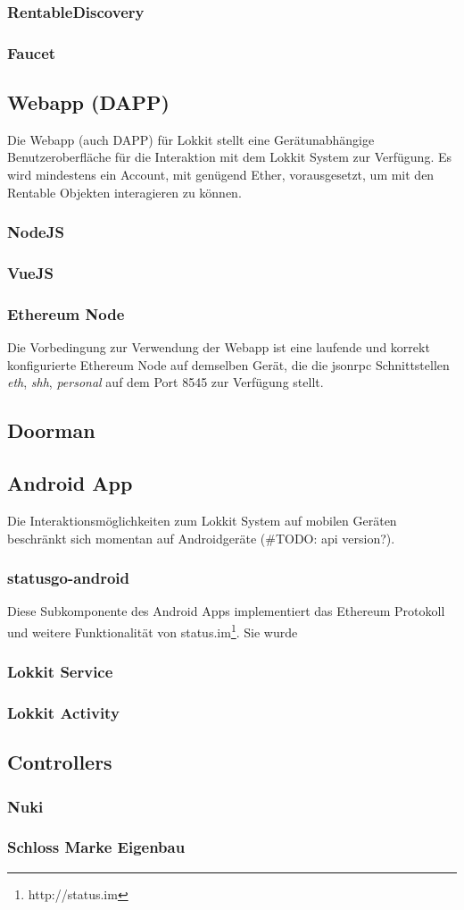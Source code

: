 \subsubsection{RentableDiscovery}
\subsubsection{Faucet}

\subsection{Webapp (DAPP)}
Die Webapp (auch DAPP) für Lokkit stellt eine Gerätunabhängige Benutzeroberfläche für die Interaktion mit dem Lokkit System zur Verfügung. Es wird mindestens ein Account, mit genügend Ether, vorausgesetzt, um mit den Rentable Objekten interagieren zu können.
\subsubsection{NodeJS}
\subsubsection{VueJS}
\subsubsection{Ethereum Node}
Die Vorbedingung zur Verwendung der Webapp ist eine laufende und korrekt konfigurierte Ethereum Node auf demselben Gerät, die die jsonrpc Schnittstellen \emph{eth}, \emph{shh}, \emph{personal} auf dem Port 8545 zur Verfügung stellt.


\subsection{Doorman}

\subsection{Android App}
Die Interaktionsmöglichkeiten zum Lokkit System auf mobilen Geräten beschränkt sich momentan auf Androidgeräte (\#TODO: api version?).
\subsubsection{statusgo-android}
Diese Subkomponente des Android Apps implementiert das Ethereum Protokoll und weitere Funktionalität von status.im\footnote{http://status.im}. Sie wurde 
\subsubsection{Lokkit Service}
\subsubsection{Lokkit Activity}

\subsection{Controllers}
\subsubsection{Nuki}
\subsubsection{Schloss Marke Eigenbau}
